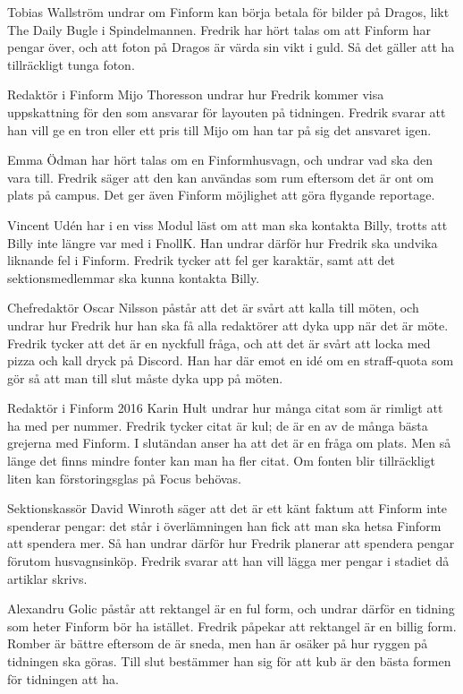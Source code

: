 \documentclass[hidelinks]{sektionsmote}
\begin{document}
Tobias Wallström undrar om Finform kan börja betala för bilder på Dragos, likt The Daily Bugle i Spindelmannen.
Fredrik har hört talas om att Finform har pengar över, och att foton på Dragos är värda sin vikt i guld.
Så det gäller att ha tillräckligt tunga foton.

Redaktör i Finform Mijo Thoresson undrar hur Fredrik kommer visa uppskattning för den som ansvarar för layouten på tidningen.
Fredrik svarar att han vill ge en tron eller ett pris till Mijo om han tar på sig det ansvaret igen.

Emma Ödman har hört talas om en Finformhusvagn, och undrar vad ska den vara till.
Fredrik säger att den kan användas som rum eftersom det är ont om plats på campus.
Det ger även Finform möjlighet att göra flygande reportage.

Vincent Udén har i en viss Modul läst om att man ska kontakta Billy, trotts att Billy inte längre var med i FnollK.
Han undrar därför hur Fredrik ska undvika liknande fel i Finform.
Fredrik tycker att fel ger karaktär, samt att det sektionsmedlemmar ska kunna kontakta Billy.

Chefredaktör Oscar Nilsson påstår att det är svårt att kalla till möten, och undrar hur Fredrik hur han ska få alla redaktörer att dyka upp när det är möte.
Fredrik tycker att det är en nyckfull fråga, och att det är svårt att locka med pizza och kall dryck på Discord.
Han har där emot en idé om en straff-quota som gör så att man till slut måste dyka upp på möten.

Redaktör i Finform 2016 Karin Hult undrar hur många citat som är rimligt att ha med per nummer.
Fredrik tycker citat är kul; de är en av de många bästa grejerna med Finform.
I slutändan anser ha att det är en fråga om plats.
Men så länge det finns mindre fonter kan man ha fler citat.
Om fonten blir tillräckligt liten kan förstoringsglas på Focus behövas.

Sektionskassör David Winroth säger att det är ett känt faktum att Finform inte spenderar pengar: det står i överlämningen han fick att man ska hetsa Finform att spendera mer.
Så han undrar därför hur Fredrik planerar att spendera pengar förutom husvagnsinköp.
Fredrik svarar att han vill lägga mer pengar i stadiet då artiklar skrivs.

Alexandru Golic påstår att rektangel är en ful form, och undrar därför en tidning som heter Finform bör ha istället.
Fredrik påpekar att rektangel är en billig form.
Romber är bättre eftersom de är sneda, men han är osäker på hur ryggen på tidningen ska göras.
Till slut bestämmer han sig för att kub är den bästa formen för tidningen att ha.
\end{document}
